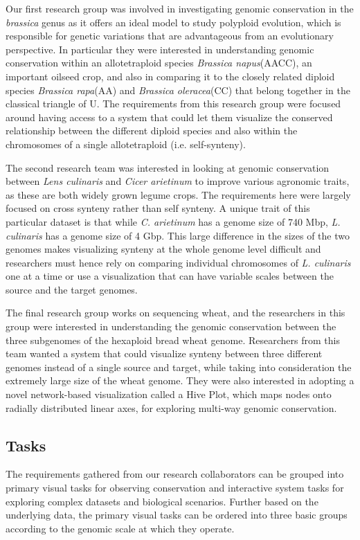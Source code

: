 Our first research group was involved in investigating genomic conservation in the \textit{brassica} genus as it offers an ideal model to study polyploid evolution, which is responsible for genetic variations that are advantageous from an evolutionary perspective\cite{madlung2013polyploidy,liu2014brassica}. In particular they were interested in understanding genomic conservation within an allotetraploid species \textit{Brassica napus}(AACC), an important oilseed crop, and also in comparing it to the closely related diploid species \textit{Brassica rapa}(AA) and \textit{Brassica oleracea}(CC) that belong together in the classical triangle of U\cite{nagaharu1935genome}. The requirements from this research group were focused around having access to a system that could let them visualize the conserved relationship between the different diploid species and also within the chromosomes of a single allotetraploid (i.e. self-synteny). 

The second research team was interested in looking at genomic conservation between \textit{Lens culinaris} and \textit{Cicer arietinum} to improve various agronomic traits, as these are both widely grown legume crops. The requirements here were largely focused on cross synteny rather than self synteny. A unique trait of this particular dataset is that while \textit{C. arietinum} has a genome size of 740 Mbp, \textit{L. culinaris} has a genome size of 4 Gbp. This large difference in the sizes of the two genomes makes visualizing synteny at the whole genome level difficult and researchers must hence rely on comparing individual chromosomes of \textit{L. culinaris} one at a time or use a visualization that can have variable scales between the source and the target genomes.

The final research group works on sequencing wheat, and the researchers in this group were interested in understanding the genomic conservation between the three subgenomes of the hexaploid bread wheat genome. Researchers from this team wanted a system that could visualize synteny between three different genomes instead of a single source and target, while taking into consideration the extremely large size of the wheat genome. They were also interested in adopting a novel network-based visualization called a Hive Plot\cite{krzywinski2011hive}, which maps nodes onto radially distributed linear axes, for exploring multi-way genomic conservation.

\subsection{Tasks}
The requirements gathered from our research collaborators can be grouped into primary visual tasks for observing conservation and interactive system tasks for exploring complex datasets and biological scenarios. Further based on the underlying data, the primary visual tasks can be ordered into three basic groups according to the genomic scale at which they operate.

